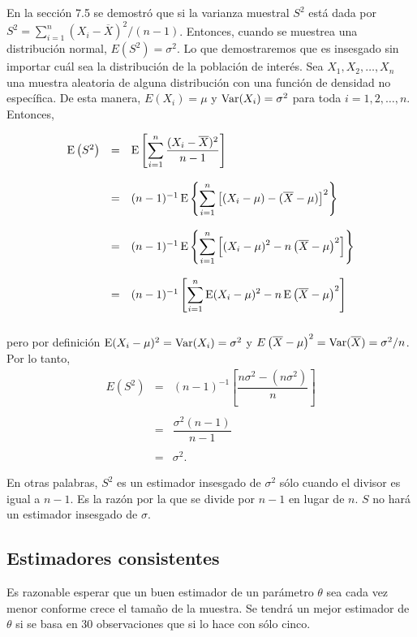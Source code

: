 En la sección 7.5 se demostró que si la varianza muestral $S^2$ está dada por $S^2=\sum_{i=1}^n(X_i-\overline{X})^2/(n-1)$. Entonces, cuando se muestrea una distribución normal, $E\left(S^2\right)=\sigma^2$. Lo que demostraremos que es insesgado sin importar cuál sea la distribución de la población de interés. Sea $X_1,X_2,\ldots,X_n$ una muestra aleatoria de alguna distribución con una función de densidad no específica. De esta manera, $E(X_i)=\mu$ y $\mathop{\mbox{\normalfont Var}}\nolimits(X_i)=\sigma^2$ para toda $i=1,2,\ldots,n.$ Entonces, 

$$
\begin{array}{rcl}
    \mathop{\mbox{\normalfont E}}\nolimits\left(S^2\right) &=& \mathop{\mbox{\normalfont E}}\nolimits\left[\displaystyle\sum_{i=1}^n \dfrac{(X_i-\overline{X})^2}{n-1}\right]\\\\
		       &=&(n-1)^{-1}\mathop{\mbox{\normalfont E}}\nolimits\left\{\displaystyle\sum_{i=1}^n \left[(X_i-\mu)-(\overline{X}-\mu)\right]^2\right\}\\\\
		       &=& (n-1)^{-1}\mathop{\mbox{\normalfont E}}\nolimits\left\{\displaystyle\sum_{i=1}^n \left[(X_i-\mu)^2-n\left(\overline{X}-\mu\right)^2\right]\right\}\\\\
		       &=& (n-1)^{-1}\left[\displaystyle\sum_{i=1}^n \mathop{\mbox{\normalfont E}}\nolimits(X_i-\mu)^2-n\mathop{\mbox{\normalfont E}}\nolimits\left(\overline{X}-\mu\right)^2\right]\\\\
\end{array}
$$
pero por definición $\mathop{\mbox{\normalfont E}}\nolimits(X_i-\mu)^2=\mathop{\mbox{\normalfont Var}}\nolimits(X_i)=\sigma^2$ y $E\left(\overline{X}-\mu\right)^2=\mathop{\mbox{\normalfont Var}}\nolimits(\overline{X})=\sigma^2/n$. Por lo tanto,
$$
\begin{array}{rcl}
    E\left(S^2\right)&=&(n-1)^{-1}\left[\dfrac{n\sigma^2-\left(n\sigma^2\right)}{n}\right]\\\\
		     &=& \dfrac{\sigma^2(n-1)}{n-1}\\\\
		     &=& \sigma^2.
\end{array}
$$

En otras palabras, $S^2$ es un estimador insesgado de $\sigma^2$ sólo cuando el divisor es igual a $n-1$. Es la razón por la que se divide por $n-1$ en lugar de $n$. $S$ no hará un estimador insesgado de $\sigma$.


\subsection{Estimadores consistentes}

Es razonable esperar que un buen estimador de un parámetro $\theta$ sea cada vez menor conforme crece el tamaño de la muestra. Se tendrá un mejor estimador de $\theta$ si se basa en $30$ observaciones que si lo hace con sólo cinco.

